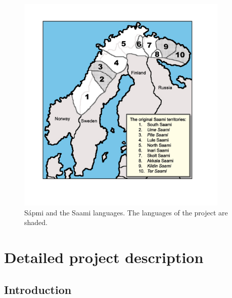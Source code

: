 \documentclass[a4paper,12pt]{article}
\begin{document}
\begin{figure}[h]
\begin{center}
\caption{S\'{a}pmi and the Saami languages. The languages of the project are shaded.} 
\label{SaamiLgs}
\includegraphics[width=0.9\textwidth]{SaamiLgs.jpeg}
\end{center}
\end{figure}

\section{Detailed project description}
\subsection{Introduction}
\end{document}
